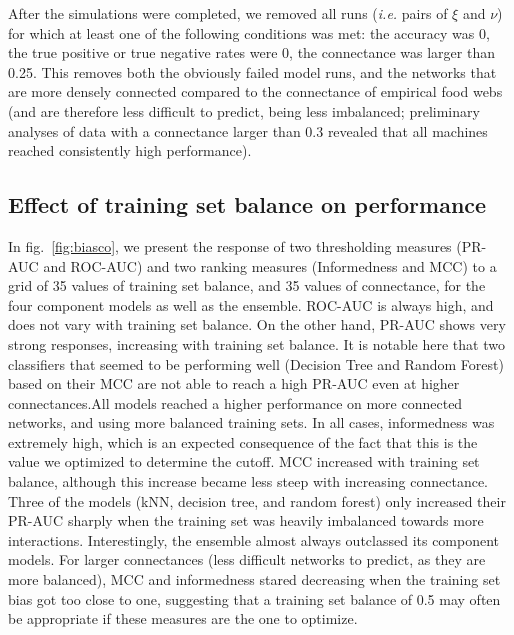 \documentclass[11pt]{article}
\begin{document}
After the simulations were completed, we removed all runs (\emph{i.e.}
pairs of \(\xi\) and \(\nu\)) for which at least one of the following
conditions was met: the accuracy was 0, the true positive or true
negative rates were 0, the connectance was larger than 0.25. This
removes both the obviously failed model runs, and the networks that are
more densely connected compared to the connectance of empirical food
webs (and are therefore less difficult to predict, being less
imbalanced; preliminary analyses of data with a connectance larger than
0.3 revealed that all machines reached consistently high performance).

\hypertarget{effect-of-training-set-balance-on-performance}{%
\subsection{Effect of training set balance on
performance}\label{effect-of-training-set-balance-on-performance}}

In fig.~\ref{fig:biasco}, we present the response of two thresholding
measures (PR-AUC and ROC-AUC) and two ranking measures (Informedness and
MCC) to a grid of 35 values of training set balance, and 35 values of
connectance, for the four component models as well as the ensemble.
ROC-AUC is always high, and does not vary with training set balance. On
the other hand, PR-AUC shows very strong responses, increasing with
training set balance. It is notable here that two classifiers that
seemed to be performing well (Decision Tree and Random Forest) based on
their MCC are not able to reach a high PR-AUC even at higher
connectances.All models reached a higher performance on more connected
networks, and using more balanced training sets. In all cases,
informedness was extremely high, which is an expected consequence of the
fact that this is the value we optimized to determine the cutoff. MCC
increased with training set balance, although this increase became less
steep with increasing connectance. Three of the models (kNN, decision
tree, and random forest) only increased their PR-AUC sharply when the
training set was heavily imbalanced towards more interactions.
Interestingly, the ensemble almost always outclassed its component
models. For larger connectances (less difficult networks to predict, as
they are more balanced), MCC and informedness stared decreasing when the
training set bias got too close to one, suggesting that a training set
balance of 0.5 may often be appropriate if these measures are the one to
optimize.
\end{document}
